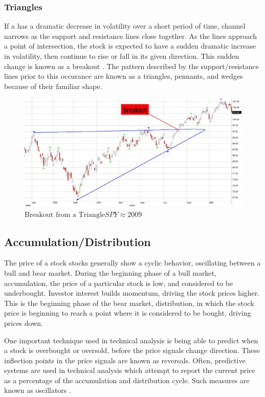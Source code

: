 \subsubsection{Triangles}
%
If a has a dramatic decrease in volatility over a short period of time, channel narrows as the support and resistance lines close together.  As the lines approach a point of intersection, the stock is expected to have a sudden dramatic increase in volatility, then continue to rise or fall in its given direction.  This sudden change is known as a breakout \cite{Barbara}.  The pattern described by the support/resistance lines prior to this occurance are known as a triangles, pennants, and wedges because of their familiar shape.
%
\begin{figure}[ht]\centering
\label{fig:triangles}
\includegraphics[width=1\textwidth]{figures/Triangle-SPY-1.eps}
\caption{$\mbox{Breakout from a Triangle} SPY \approx 2009$}
\end{figure}
%
\subsection{Accumulation/Distribution}
%
The price of a stock stocks generally show a cyclic behavior, oscillating between a bull and bear market.  During the beginning phase of a bull market, accumulation, the price of a particular stock is low, and considered to be underbought.  Investor interest builds momentum, driving the stock prices higher.  This is the beginning phase of the bear market, distribution, in which the stock price is beginning to reach a point where it is considered to be bought, driving prices down\cite{Bonon}.
\par
One important technique used in technical analysis is being able to predict when a stock is overbought or oversold, before the price signals change direction.  These inflection points in the price signals are known as reversals.  Often, predictive systems are used in technical analysis which attempt to report the current price as a percentage of the accumulation and distribution cycle.  Such measures are known as oscillators \cite{Barbara}.
%
